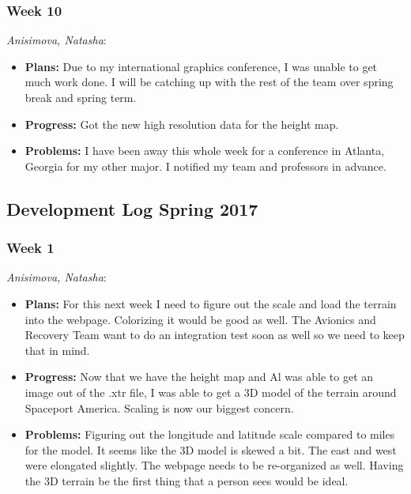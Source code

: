 \documentclass[10pt,draftclsnofoot,onecolumn]{IEEEtran}
\newcommand{\subsubsubsection}[1]{
	\hfill\break\textit{#1}:
}
\begin{document}
\subsubsection{Week 10}
\subsubsubsection{Anisimova, Natasha}
\begin{itemize}
	\item \textbf{Plans: }
	Due to my international graphics conference, I was unable to get much work done. I will be catching up with the rest of the team over spring break and spring term.
	\item \textbf{Progress: }
	Got the new high resolution data for the height map.

	\item \textbf{Problems: }
	I have been away this whole week for a conference in Atlanta, Georgia for my other major. I notified my team and professors in advance.
\end{itemize}

\subsection{Development Log Spring 2017}


\subsubsection{Week 1}
\subsubsubsection{Anisimova, Natasha}
\begin{itemize}
	\item \textbf{Plans: }
	For this next week I need to figure out the scale and load the terrain into the webpage. Colorizing it would be good as well. The Avionics and Recovery Team want to do an integration test soon as well so we need to keep that in mind.
	\item \textbf{Progress: }
	Now that we have the height map and Al was able to get an image out of the .xtr file, I was able to get a 3D model of the 	terrain around Spaceport America. Scaling is now our biggest concern.
	\item \textbf{Problems: }
	Figuring out the longitude and latitude scale compared to miles for the model. It seems like the 3D model is skewed a bit. The east and west were elongated slightly. The webpage needs to be re-organized as well. Having the 3D terrain be the first thing that a person sees would be ideal.
\end{itemize}
\end{document}
